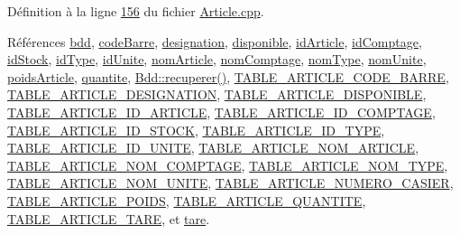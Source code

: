Définition à la ligne \hyperlink{_article_8cpp_source_l00156}{156} du fichier \hyperlink{_article_8cpp_source}{Article.\+cpp}.



Références \hyperlink{_article_8h_source_l00082}{bdd}, \hyperlink{_article_8h_source_l00090}{code\+Barre}, \hyperlink{_article_8h_source_l00091}{designation}, \hyperlink{_article_8h_source_l00093}{disponible}, \hyperlink{_article_8h_source_l00084}{id\+Article}, \hyperlink{_article_8h_source_l00088}{id\+Comptage}, \hyperlink{_article_8h_source_l00083}{id\+Stock}, \hyperlink{_article_8h_source_l00086}{id\+Type}, \hyperlink{_article_8h_source_l00096}{id\+Unite}, \hyperlink{_article_8h_source_l00085}{nom\+Article}, \hyperlink{_article_8h_source_l00089}{nom\+Comptage}, \hyperlink{_article_8h_source_l00087}{nom\+Type}, \hyperlink{_article_8h_source_l00097}{nom\+Unite}, \hyperlink{_article_8h_source_l00094}{poids\+Article}, \hyperlink{_article_8h_source_l00092}{quantite}, \hyperlink{_bdd_8cpp_source_l00187}{Bdd\+::recuperer()}, \hyperlink{_article_8h_source_l00038}{T\+A\+B\+L\+E\+\_\+\+A\+R\+T\+I\+C\+L\+E\+\_\+\+C\+O\+D\+E\+\_\+\+B\+A\+R\+RE}, \hyperlink{_article_8h_source_l00039}{T\+A\+B\+L\+E\+\_\+\+A\+R\+T\+I\+C\+L\+E\+\_\+\+D\+E\+S\+I\+G\+N\+A\+T\+I\+ON}, \hyperlink{_article_8h_source_l00041}{T\+A\+B\+L\+E\+\_\+\+A\+R\+T\+I\+C\+L\+E\+\_\+\+D\+I\+S\+P\+O\+N\+I\+B\+LE}, \hyperlink{_article_8h_source_l00032}{T\+A\+B\+L\+E\+\_\+\+A\+R\+T\+I\+C\+L\+E\+\_\+\+I\+D\+\_\+\+A\+R\+T\+I\+C\+LE}, \hyperlink{_article_8h_source_l00036}{T\+A\+B\+L\+E\+\_\+\+A\+R\+T\+I\+C\+L\+E\+\_\+\+I\+D\+\_\+\+C\+O\+M\+P\+T\+A\+GE}, \hyperlink{_article_8h_source_l00031}{T\+A\+B\+L\+E\+\_\+\+A\+R\+T\+I\+C\+L\+E\+\_\+\+I\+D\+\_\+\+S\+T\+O\+CK}, \hyperlink{_article_8h_source_l00034}{T\+A\+B\+L\+E\+\_\+\+A\+R\+T\+I\+C\+L\+E\+\_\+\+I\+D\+\_\+\+T\+Y\+PE}, \hyperlink{_article_8h_source_l00044}{T\+A\+B\+L\+E\+\_\+\+A\+R\+T\+I\+C\+L\+E\+\_\+\+I\+D\+\_\+\+U\+N\+I\+TE}, \hyperlink{_article_8h_source_l00033}{T\+A\+B\+L\+E\+\_\+\+A\+R\+T\+I\+C\+L\+E\+\_\+\+N\+O\+M\+\_\+\+A\+R\+T\+I\+C\+LE}, \hyperlink{_article_8h_source_l00037}{T\+A\+B\+L\+E\+\_\+\+A\+R\+T\+I\+C\+L\+E\+\_\+\+N\+O\+M\+\_\+\+C\+O\+M\+P\+T\+A\+GE}, \hyperlink{_article_8h_source_l00035}{T\+A\+B\+L\+E\+\_\+\+A\+R\+T\+I\+C\+L\+E\+\_\+\+N\+O\+M\+\_\+\+T\+Y\+PE}, \hyperlink{_article_8h_source_l00045}{T\+A\+B\+L\+E\+\_\+\+A\+R\+T\+I\+C\+L\+E\+\_\+\+N\+O\+M\+\_\+\+U\+N\+I\+TE}, \hyperlink{_article_8h_source_l00046}{T\+A\+B\+L\+E\+\_\+\+A\+R\+T\+I\+C\+L\+E\+\_\+\+N\+U\+M\+E\+R\+O\+\_\+\+C\+A\+S\+I\+ER}, \hyperlink{_article_8h_source_l00042}{T\+A\+B\+L\+E\+\_\+\+A\+R\+T\+I\+C\+L\+E\+\_\+\+P\+O\+I\+DS}, \hyperlink{_article_8h_source_l00040}{T\+A\+B\+L\+E\+\_\+\+A\+R\+T\+I\+C\+L\+E\+\_\+\+Q\+U\+A\+N\+T\+I\+TE}, \hyperlink{_article_8h_source_l00043}{T\+A\+B\+L\+E\+\_\+\+A\+R\+T\+I\+C\+L\+E\+\_\+\+T\+A\+RE}, et \hyperlink{_article_8h_source_l00095}{tare}.



